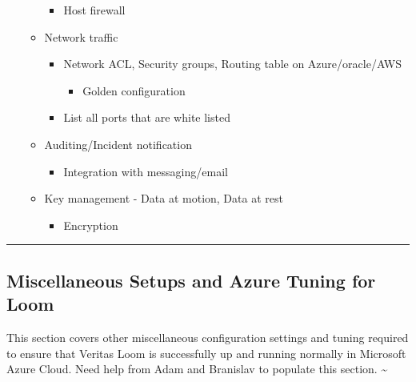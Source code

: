 \documentclass[letterpaper,10pt,english]{sphinxmanual}
\begin{document}
\begin{itemize}
\begin{itemize}
\begin{itemize}
\begin{itemize}
\end{itemize}

\item {} 
Host firewall

\end{itemize}

\item {} 
Network traffic
\begin{itemize}
\item {} 
Network ACL, Security groups, Routing table on Azure/oracle/AWS
\begin{itemize}
\item {} 
Golden configuration

\end{itemize}

\item {} 
List all ports that are white listed

\end{itemize}

\item {} 
Auditing/Incident notification
\begin{itemize}
\item {} 
Integration with messaging/email

\end{itemize}

\item {} 
Key management - Data at motion, Data at rest
\begin{itemize}
\item {} 
Encryption

\end{itemize}

\end{itemize}

\end{itemize}


\bigskip\hrule\bigskip



\subsection{Miscellaneous Setups and Azure Tuning for Loom}
\label{\detokenize{loom_installation_guide:miscellaneous-setups-and-azure-tuning-for-loom}}
This section covers other miscellaneous configuration settings and tuning required to ensure that Veritas Loom is successfully up and running normally in Microsoft Azure Cloud.  Need help from Adam and Branislav to populate this section.
\textasciitilde{}
\end{document}
